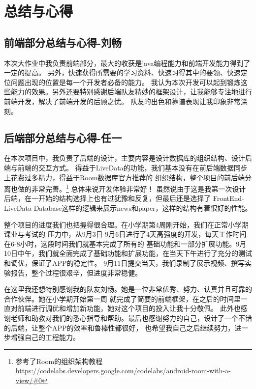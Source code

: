 \documentclass[UTF8]{article}
\begin{document}
\newpage
\section{总结与心得}
\subsection{前端部分总结与心得-刘畅}
本次大作业中我负责前端部分，最大的收获是java编程能力和前端开发能力得到了一定的提高。
另外，快速获得所需要的学习资料、快速习得其中的要领、快速定位问题出现的位置是每一个开发者必备的能力。
我认为本次开发可以起到锻炼这些能力的效果。另外还要特别感谢后端队友精妙的框架设计，让我能够专注地进行前端开发，解决了前端开发的后顾之忧。
队友的出色和靠谱表现让我印象非常深刻。

\subsection{后端部分总结与心得-任一}
在本次项目中，我负责了后端的设计，主要内容是设计数据库的组织结构、设计后端与前端的交互方式。
得益于LiveData的功能，我们基本没有在前后端数据同步上花费过多精力，得益于Room数据库官方推荐的
组织结构，整个项目的前后端分离也做的非常完善。\footnote{参考了Room的组织架构教程\url{https://codelabs.developers.google.com/codelabs/android-room-with-a-view/#0}}
总体来说开发体验非常好！
虽然说由于这是我第一次设计后端，在一开始的结构选择上也有过犹豫和反复，但最后还是选择了
FrontEnd-LiveData-Database这样的逻辑来展示news和paper，这样的结构有着很好的性能。

整个项目的进度我们也把握得很合理。在小学期第4周刚开始，我们在正常小学期课业与考试的
压力中，从9月3日-9月6日进行了4天高强度的开发，每天工作时间在6-8小时，这段时间我们就基本完成了所有的
基础功能和一部分扩展功能。9月10日中午，我们就全面完成了基础功能和扩展功能，在当天下午进行了充分的测试和调优，保证了APP的稳定性。
9月11日提交当天，我们录制了展示视频、撰写实验报告，整个过程很艰辛，但进度非常稳健。

在这里我还想特别感谢我的队友刘畅。她是一位非常优秀、努力、认真并且可靠的合作伙伴。她在小学期开始第一周
就完成了简要的前端框架，在之后的时间里一直对前端进行调优和增加新功能，她对这个项目的投入让我十分敬佩。
此外也感谢老师和助教对我们的悉心指导和帮助。最后也感谢努力的自己，设计了一个不错的后端，让整个APP的效率和鲁棒性都很好，
也希望我自己之后继续努力，进一步增强自己的工程能力。


\end{document}
